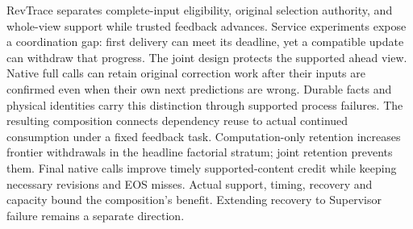 RevTrace separates complete-input eligibility, original selection authority,
and whole-view support while trusted feedback advances. Service experiments
expose a coordination gap: first delivery can meet its deadline, yet a
compatible update can withdraw that progress. The joint design protects
the supported ahead view. Native full calls can retain original correction
work after their inputs are confirmed even when their own next predictions
are wrong. Durable facts and physical identities carry this distinction
through supported process failures. The resulting composition connects
dependency reuse to actual continued consumption under a fixed feedback
task. Computation-only retention increases frontier withdrawals in the
headline factorial stratum; joint retention prevents them. Final native
calls improve timely supported-content credit while keeping necessary
revisions and EOS misses. Actual support, timing, recovery and capacity
bound the composition's benefit.
Extending recovery to Supervisor failure remains a separate direction.

